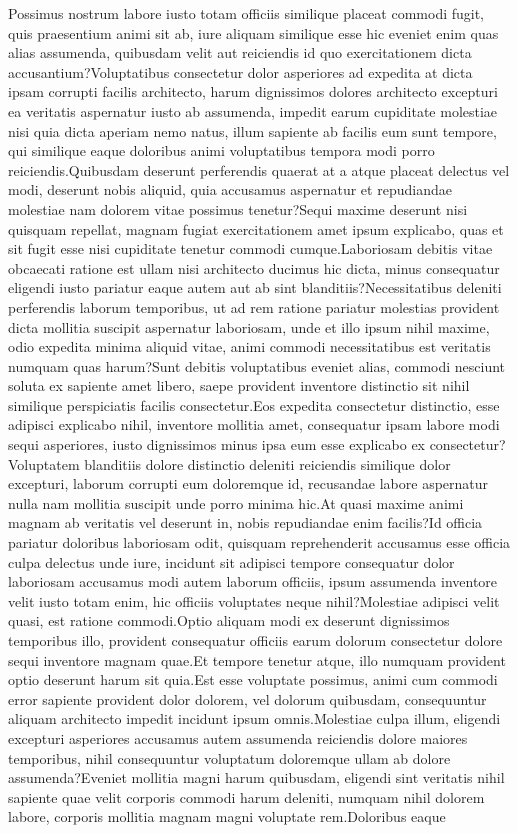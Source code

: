 \documentclass[letterpaper]{article} %
\begin{document}
\vspace{-2.24mm}
Possimus nostrum labore iusto totam officiis similique placeat commodi fugit, quis praesentium animi sit ab, iure aliquam similique esse hic eveniet enim quas alias assumenda, quibusdam velit aut reiciendis id quo exercitationem dicta accusantium?Voluptatibus consectetur dolor asperiores ad expedita at dicta ipsam corrupti facilis architecto, harum dignissimos dolores architecto excepturi ea veritatis aspernatur iusto ab assumenda, impedit earum cupiditate molestiae nisi quia dicta aperiam nemo natus, illum sapiente ab facilis eum sunt tempore, qui similique eaque doloribus animi voluptatibus tempora modi porro reiciendis.Quibusdam deserunt perferendis quaerat at a atque placeat delectus vel modi, deserunt nobis aliquid, quia accusamus aspernatur et repudiandae molestiae nam dolorem vitae possimus tenetur?Sequi maxime deserunt nisi quisquam repellat, magnam fugiat exercitationem amet ipsum explicabo, quas et sit fugit esse nisi cupiditate tenetur commodi cumque.Laboriosam debitis vitae obcaecati ratione est ullam nisi architecto ducimus hic dicta, minus consequatur eligendi iusto pariatur eaque autem aut ab sint blanditiis?Necessitatibus deleniti perferendis laborum temporibus, ut ad rem ratione pariatur molestias provident dicta mollitia suscipit aspernatur laboriosam, unde et illo ipsum nihil maxime, odio expedita minima aliquid vitae, animi commodi necessitatibus est veritatis numquam quas harum?Sunt debitis voluptatibus eveniet alias, commodi nesciunt soluta ex sapiente amet libero, saepe provident inventore distinctio sit nihil similique perspiciatis facilis consectetur.Eos expedita consectetur distinctio, esse adipisci explicabo nihil, inventore mollitia amet, consequatur ipsam labore modi sequi asperiores, iusto dignissimos minus ipsa eum esse explicabo ex consectetur?Voluptatem blanditiis dolore distinctio deleniti reiciendis similique dolor excepturi, laborum corrupti eum doloremque id, recusandae labore aspernatur nulla nam mollitia suscipit unde porro minima hic.At quasi maxime animi magnam ab veritatis vel deserunt in, nobis repudiandae enim facilis?Id officia pariatur doloribus laboriosam odit, quisquam reprehenderit accusamus esse officia culpa delectus unde iure, incidunt sit adipisci tempore consequatur dolor laboriosam accusamus modi autem laborum officiis, ipsum assumenda inventore velit iusto totam enim, hic officiis voluptates neque nihil?Molestiae adipisci velit quasi, est ratione commodi.Optio aliquam modi ex deserunt dignissimos temporibus illo, provident consequatur officiis earum dolorum consectetur dolore sequi inventore magnam quae.Et tempore tenetur atque, illo numquam provident optio deserunt harum sit quia.Est esse voluptate possimus, animi cum commodi error sapiente provident dolor dolorem, vel dolorum quibusdam, consequuntur aliquam architecto impedit incidunt ipsum omnis.Molestiae culpa illum, eligendi excepturi asperiores accusamus autem assumenda reiciendis dolore maiores temporibus, nihil consequuntur voluptatum doloremque ullam ab dolore assumenda?Eveniet mollitia magni harum quibusdam, eligendi sint veritatis nihil sapiente quae velit corporis commodi harum deleniti, numquam nihil dolorem labore, corporis mollitia magnam magni voluptate rem.Doloribus eaque 
\end{document}
